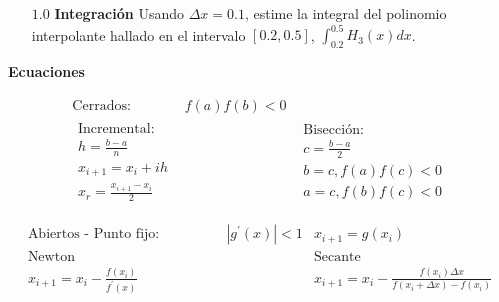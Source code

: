 \documentclass[12pt]{article}
\begin{document}
\begin{enumerate}[leftmargin=*,widest=9]
\begin{itemize}
    \vspace{5cm}
    
    \item[$1.0$] \textbf{Integración} Usando $\Delta x = 0.1$, estime la integral del polinomio interpolante hallado en el intervalo $\left[0.2, 0.5\right]$, $\int_{0.2}^{0.5} H_{3}(x)dx$.
    
    \end{itemize}
    
  \end{enumerate}
  
  \clearpage
  \textbf{Ecuaciones}
  
\begin{align*}
  \text{Cerrados: } & f(a)f(b)<0 &  \\
  \begin{array}{c}
  \text{Incremental:}\\
  h = \frac{b-a}{n} \\
  x_{i+1} = x_i + ih\\
  x_r = \frac{x_{i+1}-x_i}{2}
  \end{array}
  & \qquad \qquad &
  \begin{array}{c}
  \text{Bisección:}\\
  c = \frac{b-a}{2}\\
  b = c, f(a)f(c)<0\\
  a = c, f(b)f(c)<0
  \end{array}
\end{align*}
  
  
  


\begin{align*}
  \text{Abiertos - Punto fijo:}& \qquad \qquad |g^\prime (x)| < 1 & x_{i+1} = g(x_i) \\
  \text{Newton} & & \text{Secante} \\
  x_{i+1} = x_i - \frac{f(x_i)}{f^\prime(x)} & \qquad \qquad &
    x_{i+1} = x_i - \frac{f(x_i)\Delta x}{f(x_i+\Delta x)-f(x_i)}
\end{align*}
  
\end{document}
